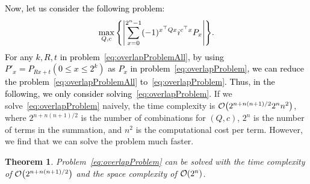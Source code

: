 \documentclass[aps,prx,onecolumn,superscriptaddress,nobibnotes,nofootinbib]{revtex4-2}
\newcommand{\black}[1]{\textcolor{black}{#1}}
\newtheorem{theorem}{Theorem}
\begin{document}
\black{Now, let us consider the following problem:
  \begin{equation}\label{eq:overlapProblem}
    \max_{Q,c} \qty{ \abs{\sum_{x=0}^{2^n-1} (-1)^{x^\top Q x} i^{c^\top x} P_{x}} }.
  \end{equation}
  For any $k,R,t$ in problem~\eqref{eq:overlapProblemAll}, by using $P'_x = P_{Rx+t} (0 \leq x \leq 2^k)$ as $P_x$ in problem~\eqref{eq:overlapProblem}, we can reduce the problem~\eqref{eq:overlapProblemAll} to~\eqref{eq:overlapProblem}.
  Thus, in the following, we only consider solving~\eqref{eq:overlapProblem}.}
If we solve~\eqref{eq:overlapProblem} naively, the time complexity is $\order{2^{n+n(n+1)/2} 2^n n^2}$, where $2^{n+n(n+1)/2}$ is the number of combinations for $(Q,c)$, $2^n$ is the number of terms in the summation, and $n^2$ is the computational cost per term.
However, we find that we can solve the problem much faster.
\begin{theorem}\label{thm:overlapProblem}
  Problem~\eqref{eq:overlapProblem} can be solved with the time complexity of $\order{2^{n+n(n+1)/2}}$ and the space complexity of $\order{2^n}$.
\end{theorem}
\end{document}
